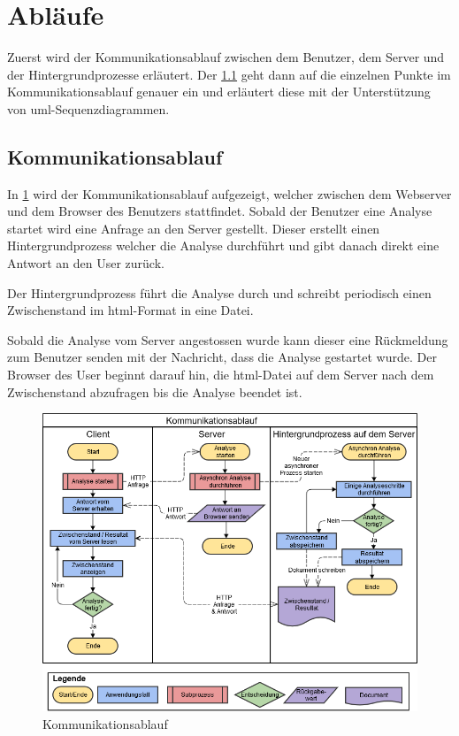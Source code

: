 \section{Abläufe}
Zuerst wird der Kommunikationsablauf zwischen dem Benutzer, dem Server und der Hintergrundprozesse erläutert. Der \cref{sec:proofofconcept:kommunikationsablauf} geht dann auf die einzelnen Punkte im Kommunikationsablauf genauer ein und erläutert diese mit der Unterstützung von \gls{uml}-Sequenzdiagrammen.

\subsection{Kommunikationsablauf}
\label{sec:proofofconcept:kommunikationsablauf}
In \cref{fig:proofofconcept:kommunikationsablauf:1} wird der Kommunikationsablauf aufgezeigt, welcher zwischen dem Webserver und dem Browser des Benutzers stattfindet. Sobald der Benutzer eine Analyse startet wird eine Anfrage an den Server gestellt. Dieser erstellt einen Hintergrundprozess welcher die Analyse durchführt und gibt danach direkt eine Antwort an den User zurück. 

Der Hintergrundprozess führt die Analyse durch und schreibt periodisch einen Zwischenstand im \gls{html}-Format in eine Datei.

Sobald die Analyse vom Server angestossen wurde kann dieser eine Rückmeldung zum Benutzer senden mit der Nachricht, dass die Analyse gestartet wurde. Der Browser des User beginnt darauf hin, die \gls{html}-Datei auf dem Server nach dem Zwischenstand abzufragen bis die Analyse beendet ist.
\begin{figure}[H]
	\RawFloats
	\centering
	\includegraphics[width=1\textwidth]{images/diagram-communication-flow}
	\caption{Kommunikationsablauf}
	\label{fig:proofofconcept:kommunikationsablauf:1}
\end{figure}

